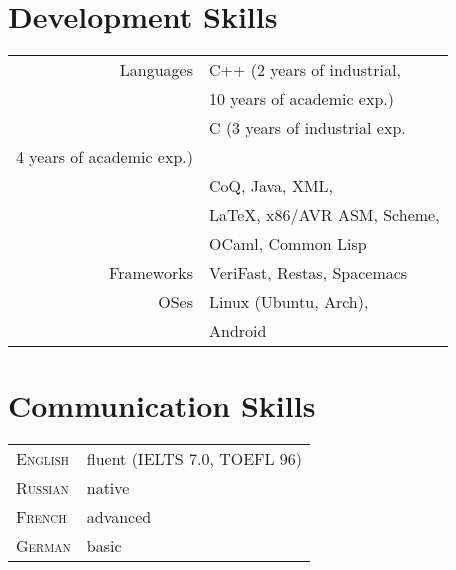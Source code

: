 \documentclass[10pt]{article} %
\begin{document}
\begin{minipage}[h]{0.44\textwidth}

\section{Development Skills} 

\begin{tabular}{rl}
Languages
&C++ (2 years of industrial,\\
&     10 years of academic exp.)\\
&C (3 years of industrial exp. \\
    4 years of academic exp.)\\
&CoQ, Java, XML,\\
&\LaTeX, x86/AVR ASM, Scheme,\\
&OCaml, Common Lisp\\
Frameworks
&VeriFast, Restas, Spacemacs\\
OSes
&Linux (Ubuntu, Arch),\\
&Android\\
\end{tabular}


\section{Communication Skills} 

\begin{tabular}{ll}
\textsc{English}
& fluent (IELTS 7.0, TOEFL 96) \\
\textsc{Russian}
& native \\
\textsc{French}
& advanced \\
\textsc{German}
& basic \\
\end{tabular}\\[10pt]

	

\end{minipage} %
\end{document}
